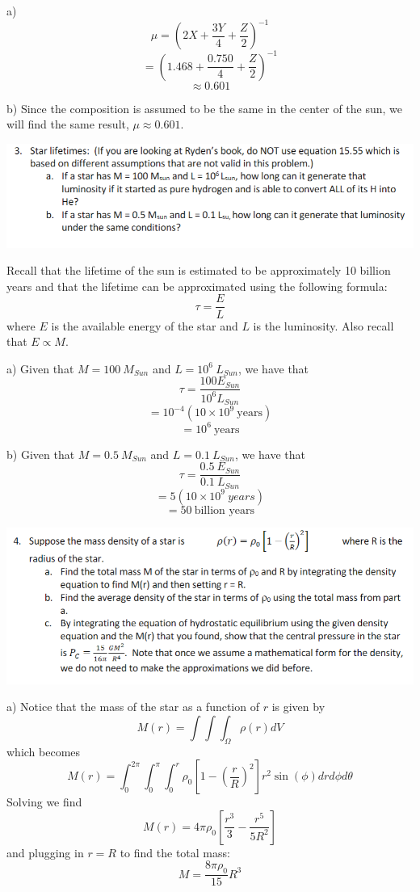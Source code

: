 \documentclass{article}
\begin{document}
a) 
\[\mu = (2X + \frac{3Y}{4} + \frac{Z}{2})^{-1}\]
\[ = (1.468 + \frac{0.750}{4} + \frac{Z}{2})^{-1}\]
\[\approx 0.601\]

b) Since the composition is assumed to be the same in the center of the sun, we will find the same result, $\mu \approx 0.601$.

\includegraphics[scale = 0.8]{probset8prob3.PNG}
\newline

Recall that the lifetime of the sun is estimated to be approximately 10 billion years and that the lifetime can be approximated using the following formula:
\[\tau = \frac{E}{L}\]
where $E$ is the available energy of the star and $L$ is the luminosity. Also recall that $E \propto M$.

a) Given that $M = 100 \: M_{Sun}$ and $L = 10^6 \: L_{Sun}$, we have that 
\[\tau = \frac{100 E_{Sun}}{10^6 L_{Sun}}\]
\[ = 10^{-4} (10 \times 10^9 \:\text{years})\]
\[ = 10^6 \: \text{years}\]

b) Given that $M = 0.5 \:M_{Sun}$ and $L = 0.1 \:L_{Sun}$, we have that
\[\tau = \frac{0.5 \:E_{Sun}}{0.1 \:L_{Sun}}\]
\[ = 5 (10 \times 10^9 \: years)\]
\[ = 50 \: \text{billion years} \]



\includegraphics[scale = 0.8]{probset8prob4.PNG}
\newline

a) Notice that the mass of the star as a function of $r$ is given by
\[M(r) = \int \int \int_{\Omega} \rho(r) dV\]
which becomes
\[M(r) = \int_0^{2\pi} \int_0^{\pi} \int_0^r \rho_0\left[1 - \left(\frac{r}{R}\right)^2\right]r^2 \sin{(\phi)} drd\phi d\theta\]
Solving we find
\[M(r) = 4\pi \rho_0\left[\frac{r^3}{3} - \frac{r^5}{5R^2}\right]\]
and plugging in $r = R$ to find the total mass:
\[M = \frac{8\pi \rho_0}{15}R^3\]
\end{document}
